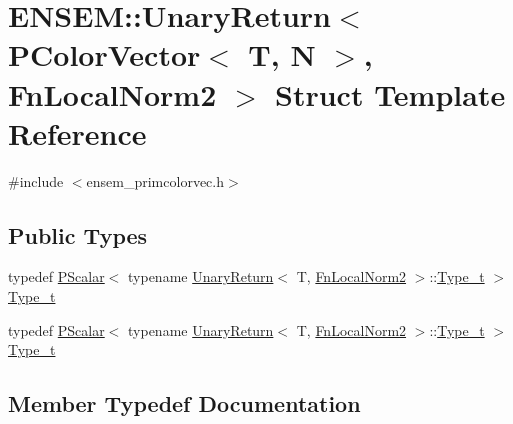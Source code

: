 \hypertarget{structENSEM_1_1UnaryReturn_3_01PColorVector_3_01T_00_01N_01_4_00_01FnLocalNorm2_01_4}{}\section{E\+N\+S\+EM\+:\+:Unary\+Return$<$ P\+Color\+Vector$<$ T, N $>$, Fn\+Local\+Norm2 $>$ Struct Template Reference}
\label{structENSEM_1_1UnaryReturn_3_01PColorVector_3_01T_00_01N_01_4_00_01FnLocalNorm2_01_4}


{\ttfamily \#include $<$ensem\+\_\+primcolorvec.\+h$>$}

\subsection*{Public Types}
\begin{DoxyCompactItemize}
\item 
typedef \mbox{\hyperlink{classENSEM_1_1PScalar}{P\+Scalar}}$<$ typename \mbox{\hyperlink{structENSEM_1_1UnaryReturn}{Unary\+Return}}$<$ T, \mbox{\hyperlink{structENSEM_1_1FnLocalNorm2}{Fn\+Local\+Norm2}} $>$\+::\mbox{\hyperlink{structENSEM_1_1UnaryReturn_3_01PColorVector_3_01T_00_01N_01_4_00_01FnLocalNorm2_01_4_ae0b040392de6e5320e94c74d9578abb8}{Type\+\_\+t}} $>$ \mbox{\hyperlink{structENSEM_1_1UnaryReturn_3_01PColorVector_3_01T_00_01N_01_4_00_01FnLocalNorm2_01_4_ae0b040392de6e5320e94c74d9578abb8}{Type\+\_\+t}}
\item 
typedef \mbox{\hyperlink{classENSEM_1_1PScalar}{P\+Scalar}}$<$ typename \mbox{\hyperlink{structENSEM_1_1UnaryReturn}{Unary\+Return}}$<$ T, \mbox{\hyperlink{structENSEM_1_1FnLocalNorm2}{Fn\+Local\+Norm2}} $>$\+::\mbox{\hyperlink{structENSEM_1_1UnaryReturn_3_01PColorVector_3_01T_00_01N_01_4_00_01FnLocalNorm2_01_4_ae0b040392de6e5320e94c74d9578abb8}{Type\+\_\+t}} $>$ \mbox{\hyperlink{structENSEM_1_1UnaryReturn_3_01PColorVector_3_01T_00_01N_01_4_00_01FnLocalNorm2_01_4_ae0b040392de6e5320e94c74d9578abb8}{Type\+\_\+t}}
\end{DoxyCompactItemize}


\subsection{Member Typedef Documentation}
\mbox{\label{structENSEM_1_1UnaryReturn_3_01PColorVector_3_01T_00_01N_01_4_00_01FnLocalNorm2_01_4_ae0b040392de6e5320e94c74d9578abb8}} 
